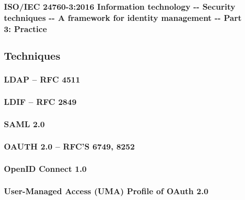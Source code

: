 \hypertarget{isoiec-24760-32016-information-technology----security-techniques----a-framework-for-identity-management----part-3-practice}{%
\subsubsection{ISO/IEC 24760-3:2016 Information technology -\/- Security
techniques -\/- A framework for identity management -\/- Part 3:
Practice}\label{isoiec-24760-32016-information-technology----security-techniques----a-framework-for-identity-management----part-3-practice}}

\hypertarget{techniques}{%
\subsection{Techniques}\label{techniques}}

\hypertarget{ldap-rfc-4511}{%
\subsubsection{LDAP -- RFC 4511}\label{ldap-rfc-4511}}

\hypertarget{ldif-rfc-2849}{%
\subsubsection{LDIF -- RFC 2849}\label{ldif-rfc-2849}}

\hypertarget{saml-2.0}{%
\subsubsection{SAML 2.0}\label{saml-2.0}}

\hypertarget{oauth-2.0-rfcs-6749-8252}{%
\subsubsection{OAUTH 2.0 -- RFC'S 6749,
8252}\label{oauth-2.0-rfcs-6749-8252}}

\hypertarget{openid-connect-1.0}{%
\subsubsection{OpenID Connect 1.0}\label{openid-connect-1.0}}

\hypertarget{user-managed-access-uma-profile-of-oauth-2.0}{%
\subsubsection{User-Managed Access (UMA) Profile of OAuth
2.0}\label{user-managed-access-uma-profile-of-oauth-2.0}}

